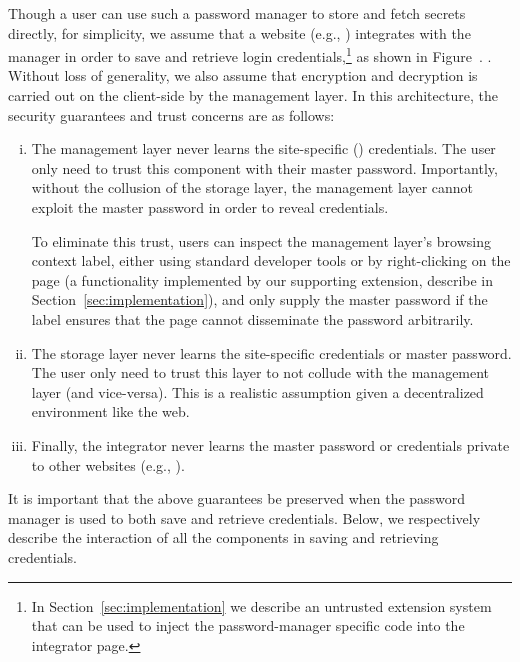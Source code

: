 %
Though a user can use such a password manager to store and fetch secrets
directly, for simplicity, we assume that a website (e.g., )
integrates with the manager in order to save and retrieve login
credentials,\footnote{ In Section~\ref{sec:implementation} we describe an
  untrusted extension system that can be used to inject the password-manager
  specific code into the integrator page.  }
\iffigures
 as shown in
Figure~.
\else
.
\fi
%
Without loss of generality, we also assume that encryption and
decryption is carried out on the client-side by the management layer.
%
In this architecture, the security guarantees and trust concerns
are as follows:
\begin{enumerate}[i)]
\item The management layer never learns the site-specific ()
  credentials. The user only need to trust this component with their master
  password. Importantly, without the collusion of the storage layer, the
  management layer cannot exploit the master password in order to reveal
  credentials.

  To eliminate this trust, users can inspect the management layer's
  browsing context label, either using standard developer tools or by
  right-clicking on the page (a functionality implemented by our
  supporting extension, describe in Section~\ref{sec:implementation}),
  and only supply the master password if the label ensures that the
  page cannot disseminate the password arbitrarily.

\item The storage layer never learns the site-specific credentials or
  master password. The user only need to trust this layer to not
  collude with the management layer (and vice-versa). This is a
  realistic assumption given a decentralized environment like the web.

\item Finally, the integrator never learns the master password or
  credentials private to other websites (e.g., ).
\end{enumerate}
%
It is important that the above guarantees be preserved when the
password manager is used to both save and retrieve credentials.
%
Below, we respectively describe the interaction of all the components
in saving and retrieving credentials.


